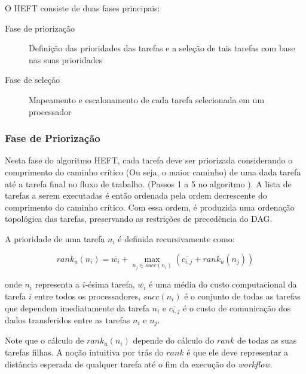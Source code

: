 O HEFT consiste de duas fases principais:

\begin{description}
	\item[Fase de priorização] Definição das prioridades das tarefas e a seleção
	de tais tarefas com base nas suas prioridades
	\item[Fase de seleção] Mapeamento e escalonamento de cada tarefa selecionada
	em um processador
\end{description}

\subsubsection{Fase de Priorização}
Nesta fase do algoritmo HEFT, cada tarefa deve ser priorizada considerando
o comprimento do caminho crítico (Ou seja, o maior caminho) de uma dada tarefa
até a tarefa final no fluxo de trabalho. (Passos 1 a 5 no algoritmo 
). A lista de tarefas a serem
executadas é então ordenada pela ordem decrescente do comprimento do caminho
crítico. Com essa ordem, é produzida uma ordenação topológica das tarefas, 
preservando as restrições de precedência do DAG.

A prioridade de uma tarefa $n_i$ é definida recursivamente como:

$$ rank_u(n_i) = \overline{w_i} + \max_{n_j \in succ(n_i)} (\overline{c_{i,j}} + rank_u(n_j)) $$

onde $n_i$ representa a $i$-ésima tarefa, $\overline{w_i}$ é uma média
do custo computacional da tarefa $i$ entre todos os processadores, $succ(n_i)$ 
é o conjunto de todas as tarefas que dependem imediatamente da tarefa $n_i$
e $\overline{c_{i,j}}$ é o custo de comunicação dos dados transferidos entre 
as tarefas $n_i$ e $n_j$. %

Note que o cálculo de $rank_u(n_i)$ depende do cálculo do $rank$ de todas as
suas tarefas filhas. A noção intuitiva por trás do $rank$ é que ele deve
representar a distância esperada de qualquer tarefa até o fim da execução do
\emph{workflow}.


